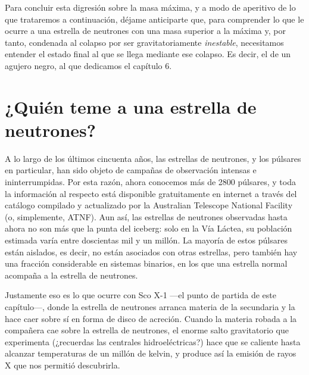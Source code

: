 Para concluir esta digresión sobre la masa máxima, y a modo de aperitivo de lo que trataremos a continuación, déjame anticiparte que, para comprender lo que le ocurre a una estrella de neutrones con una masa superior a la máxima y, por tanto, condenada al colapso por ser gravitatoriamente \emph{inestable}, necesitamos entender el estado final al que se llega mediante ese colapso. Es decir, el de un agujero negro, al que dedicamos el capítulo 6.

\section{¿Quién teme a una estrella de neutrones?}\label{sec:05-danger}

A lo largo de los últimos cincuenta años, las estrellas de neutrones, y los púlsares en particular, han sido objeto de campañas de observación intensas e ininterrumpidas. Por esta razón, ahora conocemos más de 2800 púlsares, y toda la información al respecto está disponible gratuitamente en internet a través del catálogo compilado y actualizado por la Australian Telescope National Facility (o, simplemente, ATNF). Aun así, las estrellas de neutrones observadas hasta ahora no son más que la punta del iceberg: solo en la Vía Láctea, su población estimada varía entre doscientas mil y un millón. La mayoría de estos púlsares están aislados, es decir, no están asociados con otras estrellas, pero también hay una fracción considerable en sistemas binarios, en los que una estrella normal acompaña a la estrella de neutrones.

Justamente eso es lo que ocurre con Sco X-1 ---el punto de partida de este capítulo---, donde la estrella de neutrones arranca materia de la secundaria y la hace caer sobre sí en forma de disco de acreción. Cuando la materia robada a la compañera cae sobre la estrella de neutrones, el enorme salto gravitatorio que experimenta (¿recuerdas las centrales hidroeléctricas?) hace que se caliente hasta alcanzar temperaturas de un millón de kelvin, y produce así la emisión de rayos X que nos permitió descubrirla.

